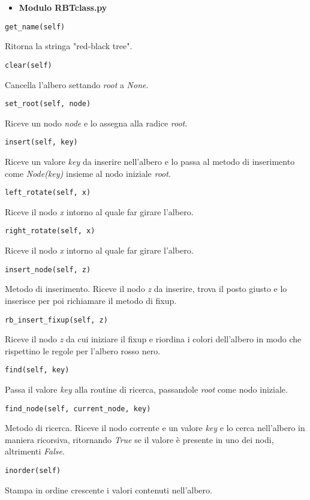 \documentclass{article}
\begin{document}
\begin{itemize}
    \item \textbf{Modulo RBTclass.py}
\end{itemize}
\begin{verbatim}get_name(self)\end{verbatim}
Ritorna la stringa "red-black tree".
\begin{verbatim}clear(self)\end{verbatim}
Cancella l'albero settando \emph{root} a \emph{None}.
\begin{verbatim}set_root(self, node)\end{verbatim}
Riceve un nodo \emph{node} e lo assegna alla radice \emph{root}.
\begin{verbatim}insert(self, key)\end{verbatim}
Riceve un valore \emph{key} da inserire nell'albero e lo passa al metodo di inserimento come \emph{Node(key)} insieme al nodo iniziale \emph{root}.
\begin{verbatim}left_rotate(self, x)\end{verbatim}
Riceve il nodo \emph{x} intorno al quale far girare l'albero.
\begin{verbatim}right_rotate(self, x)\end{verbatim}
Riceve il nodo \emph{x} intorno al quale far girare l'albero.
\begin{verbatim}insert_node(self, z)\end{verbatim}
Metodo di inserimento. Riceve il nodo \emph{z} da inserire, trova il posto giusto e lo inserisce per poi richiamare il metodo di fixup.
\begin{verbatim}rb_insert_fixup(self, z)\end{verbatim}
Riceve il nodo \emph{z} da cui iniziare il fixup e riordina i colori dell'albero in modo che rispettino le regole per l'albero rosso nero.
\begin{verbatim}find(self, key)\end{verbatim}
Passa il valore \emph{key} alla routine di ricerca, passandole \emph{root} come nodo iniziale.
\begin{verbatim}find_node(self, current_node, key)\end{verbatim}
Metodo di ricerca. Riceve il nodo corrente e un valore \emph{key} e lo cerca nell'albero in maniera ricorsiva, ritornando \emph{True} se il valore è presente in uno dei nodi, altrimenti \emph{False}.
\begin{verbatim}inorder(self)\end{verbatim}
Stampa in ordine crescente i valori contenuti nell'albero.\\
\end{document}
